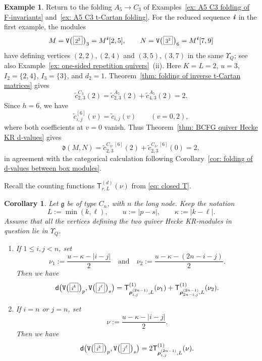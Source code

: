 \documentclass[12pt, leqno]{amsart}
\numberwithin{equation}{section}
\theoremstyle{plain}
\newtheorem{corollary}[lemma]{Corollary}
\theoremstyle{definition}
\newtheorem{example}[lemma]{Example}
\newcommand{\Vkm}[1]{%
  \ttV\bigl(\hspace{0.2ex}\scalebox{.8}{\(\boxed{#1}\)}\hspace{0.2ex}\bigr)%
}
\newcommand{\seteq}{\mathbin{:=}}
\newcommand{\g}{\mathfrak{g}}
\newcommand{\de}{\mathfrak{d}}
\newcommand{\ii}{ \textbf{\textit{i}}}
\newcommand{\tc}{\widetilde{c}}
\newcommand{\sfT}{\mathsf{T}}
\newcommand{\brho}{{\boldsymbol{\rho}}}
\newcommand{\ttV}{\mathtt{V}}
\newcommand{\qtq}[1][{and}]{\quad\text{{#1}}\quad}
\newcommand{\ee}{\end{enumerate}}
\newcommand{\bnum}{\begin{enumerate}[{\rm (i)}]}
\begin{document}
\begin{example}\label{ex: A5 C3 KR coefficient comparison}
Return to the folding \(A_5\to C_3\) of
Examples~\ref{ex: A5 C3 folding of F-invariants}
and~\ref{ex: A5 C3 t-Cartan folding}.  For the reduced sequence
\(\ii\) in the first example, the modules
\[
M=\Vkm{2^2}_3=M^\ii[2,5],\qquad
N=\Vkm{3^2}_6=M^\ii[7,9]
\]
have defining vertices \((2,2),(2,4)\) and \((3,5),(3,7)\) in the
same \(\Upsilon_Q\); see also
Example~\ref{ex: one-sided repetition quivers}~(ii).
Here \(K=L=2\), \(u=3\), \(I_2=\{2,4\}\), \(I_3=\{3\}\), and
\(d_2=1\).  Theorem~\ref{thm: folding of inverse t-Cartan matrices}
gives
\[
\tc_{2,3}^{C_3}(2)
=\tc_{2,3}^{A_5}(2)+\tc_{4,3}^{A_5}(2)=2.
\]
Since \(h=6\), we have
\[
\tc_{i,j}^{[6]}(v)=\tc_{i,j}(v)
\qquad(v=0,2),
\]
where both coefficients at \(v=0\) vanish.  Thus
Theorem~\ref{thm: BCFG quiver Hecke KR d-values} gives
\[
\de(M,N)
=\tc_{2,3}^{C_3,[6]}(2)+\tc_{2,3}^{C_3,[6]}(0)=2,
\]
in agreement with the categorical calculation following
Corollary~\ref{cor: folding of d-values between box modules}.
\end{example}

Recall the counting functions \(\sfT^{(d)}_{r,L}(\nu)\) from
\eqref{eq: closed T}.


\begin{corollary}\label{cor: type C quiver Hecke KR closed formula}
Let \(\g\) be of type \(C_n\), with \(n\) the long node.  Keep the
notation
\[
L\seteq\min(k,\ell), \qquad u\seteq|p-s|, \qquad \kappa\seteq|k-\ell|.
\]
Assume that all the vertices defining the two quiver Hecke
KR-modules in question lie in \(\Upsilon_Q\).
\bnum
\item If \(1\leq i,j<n\), set
\[
\nu_1\seteq\frac{u-\kappa-|i-j|}{2}
\qtq
\nu_2\seteq\frac{u-\kappa-(2n-i-j)}{2}.
\]
Then we have
\[
\de\bigl( \Vkm{i^k}_p, \Vkm{j^\ell}_s \bigr)
=
\sfT^{(1)}_{\brho^{(2n-1)}_{i,j},L}(\nu_1)
+
\sfT^{(1)}_{\brho^{(2n-1)}_{2n-i,j},L}(\nu_2).
\]
\item If \(i=n\) or \(j=n\), set
\[
\nu\seteq \frac{u-\kappa-|i-j|}{2}.
\]
Then we have
\[
\de\bigl(\Vkm{i^k}_p,\Vkm{j^\ell}_s\bigr)
=
2\sfT^{(1)}_{\brho^{(2n-1)}_{i,j},L}(\nu). 
\]
\ee 
\end{corollary}
\end{document}
